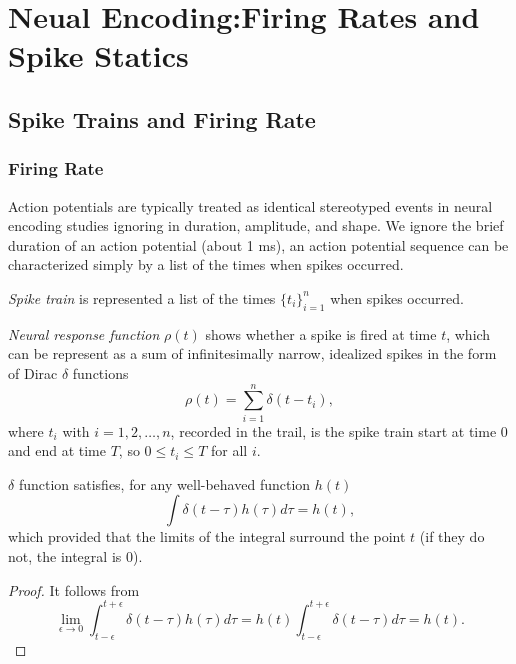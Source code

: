 
\chapter{Neual Encoding:Firing Rates and Spike Statics}
\label{cha:Firing Rates and Spike Statics}

\section{Spike Trains and Firing Rate}
\label{sec:firing rate}

\subsection{Firing Rate}

\begin{asm}
  Action potentials are typically treated as identical 
  stereotyped events in neural encoding
  studies ignoring in duration, amplitude, and shape. 
  We ignore the brief duration of an action potential (about 1 ms),
  an action potential sequence can be characterized simply by a list of the
  times when spikes occurred.
\end{asm} 

\begin{ntn}
  \emph{Spike train} is represented a list of the times $\{t_i\}_{i=1}^n$ when spikes occurred.
\end{ntn}

\begin{defn}
  \emph{Neural response function} $\rho (t)$ shows whether a spike is fired at time $t$,
   which can be represent as a sum of infinitesimally narrow, 
  idealized spikes in the form of Dirac $\delta$ functions
  \begin{equation}
    \label{equ:1.1}
    \rho(t)=\sum_{i=1}^n\delta(t-t_i),
  \end{equation}
  where $t_i$ with $i=1,2,\dots,n$, recorded in the trail, is the spike train
   start at time $0$ and end at time $T$, so $0\leq t_i\leq T$ for all $i$.
\end{defn}

\begin{lem}
  $\delta$ function satisfies, for any well-behaved function $h(t)$
  \begin{equation}
    \label{equ:1.3}
    \int \delta(t-\tau)h(\tau)d\tau=h(t),
  \end{equation}
  which provided that the limits of the integral surround the point $t$ (if they do not,
  the integral is $0$).
  \begin{proof}
  It follows from
  \begin{equation*}
    \lim_{\epsilon\rightarrow 0}\int_{t - \epsilon}^{t + \epsilon} \delta(t-\tau)h(\tau)d\tau
    =h(t)\int_{t - \epsilon}^{t + \epsilon} \delta(t-\tau)d\tau=h(t).
  \end{equation*}
  \end{proof}

\end{lem}

